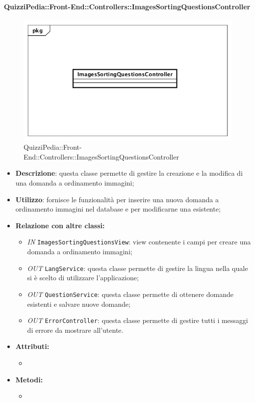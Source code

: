\paragraph{QuizziPedia::Front-End::Controllers::ImagesSortingQuestionsController}
\begin{figure}
	\centering
	\includegraphics[scale=0.45]{UML/Classi/Front-End/QuizziPedia_Front-end_Controller_ImagesSortingQuestionsController.png}
	\caption{QuizziPedia::Front-End::Controllers::ImagesSortingQuestionsController}
\end{figure}
\begin{itemize}
	\item \textbf{Descrizione}: questa classe permette di gestire la creazione e la modifica di una domanda a ordinamento immagini;
	\item \textbf{Utilizzo}: fornisce le funzionalità per inserire una nuova domanda a ordinamento immagini nel database e per modificarne una esistente;
	\item \textbf{Relazione con altre classi:}
	\begin{itemize}
		\item \textit{IN} \texttt{ImagesSortingQuestionsView}: view contenente i campi per creare una domanda a ordinamento immagini; 
		\item \textit{OUT} \texttt{LangService}: questa classe permette di gestire la lingua nella quale si è scelto di utilizzare l'applicazione;
		\item \textit{OUT} \texttt{QuestionService}: questa classe permette di ottenere domande esistenti e salvare nuove domande;
		\item \textit{OUT} \texttt{ErrorController}: questa classe permette di gestire tutti i messaggi di errore da mostrare all'utente.
	\end{itemize}
	\item \textbf{Attributi:}
	\begin{itemize}
		\item 
	\end{itemize}
	\item \textbf{Metodi:}
	\begin{itemize}
		\item 
	\end{itemize}
\end{itemize}

